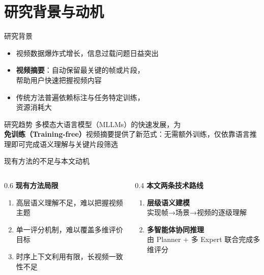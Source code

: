 
\section{研究背景与动机}

\begin{frame}{研究背景}
  \begin{itemize}
    \item 视频数据爆炸式增长，信息过载问题日益突出
    \item \textbf{视频摘要}：自动保留最关键的帧或片段，\\ 帮助用户快速把握视频内容
    \item 传统方法普遍依赖标注与任务特定训练，\\ 资源消耗大
  \end{itemize}
  \begin{block}{研究趋势}
    多模态大语言模型（MLLMs）的快速发展，为\textbf{免训练（Training-free）}视频摘要提供了新范式：无需额外训练，仅依靠语言推理即可完成语义理解与关键片段筛选
  \end{block}
\end{frame}

\begin{frame}{现有方法的不足与本文动机}
  \begin{columns}[T]
    \begin{column}{0.6\textwidth}
      \textbf{现有方法局限}
      \begin{enumerate}
        \item 高层语义理解不足，难以把握视频主题
        \item 单一评分机制，难以覆盖多维评价目标
        \item 时序上下文利用有限，长视频一致性不足
      \end{enumerate}
    \end{column}
    \begin{column}{0.4\textwidth}
      \textbf{本文两条技术路线}
      \begin{enumerate}
        \item \textbf{层级语义建模}\\实现帧→场景→视频的逐级理解
        \item \textbf{多智能体协同推理}\\由 Planner + 多 Expert 联合完成多维评分
      \end{enumerate}
    \end{column}
  \end{columns}
\end{frame}

